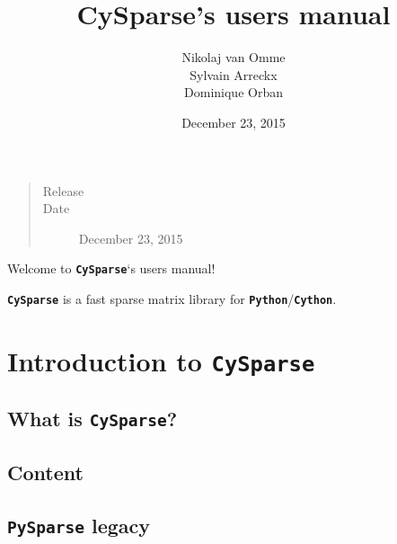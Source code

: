 \documentclass[letterpaper,10pt,english]{sphinxmanual}
\title{CySparse's users manual}
\date{December 23, 2015}
\author{Nikolaj van Omme\\Sylvain Arreckx\\Dominique Orban}
\begin{document}
\maketitle
\tableofcontents
{}\label{contents::doc}

\begin{quote}\begin{description}
\item[{Release}] 

\item[{Date}] \leavevmode
December 23, 2015

\end{description}\end{quote}

Welcome to \textbf{\texttt{CySparse}}`s users manual!

\textbf{\texttt{CySparse}} is a fast sparse matrix library for \textbf{\texttt{Python}}/\textbf{\texttt{Cython}}.


\chapter{Introduction to \textbf{\texttt{CySparse}}}
\label{introduction:cysparse-s-users-manual}\label{introduction::doc}\label{introduction:introduction-to-cysparse}

\section{What is \textbf{\texttt{CySparse}}?}
\label{introduction:what-is-cysparse}

\section{Content}
\label{introduction:content}

\section{\textbf{\texttt{PySparse}} legacy}
\label{introduction:pysparse-legacy}
\end{document}
